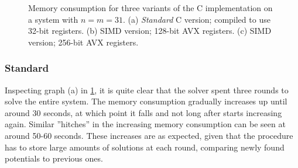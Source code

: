 \begin{figure}[t]
    \centering
    \caption{Memory consumption for three variants of the C implementation on a system with $n = m = 31$. (a) \textit{Standard} C version; compiled to use 32-bit registers. (b) SIMD version; 128-bit AVX registers. (c) SIMD version; 256-bit AVX registers.} \label{fig:mem_dinur}
\end{figure}

\subsubsection{Standard}

Inspecting graph (a) in \cref{fig:mem_dinur}, it is quite clear that the solver spent three rounds to solve the entire system. The memory consumption gradually increases up until around 30 seconds, at which point it falls and not long after starts increasing again. Similar ''hitches'' in the increasing memory consumption can be seen at around 50-60 seconds. These increases are as expected, given that the procedure has to store large amounts of solutions at each round, comparing newly found potentials to previous ones.

